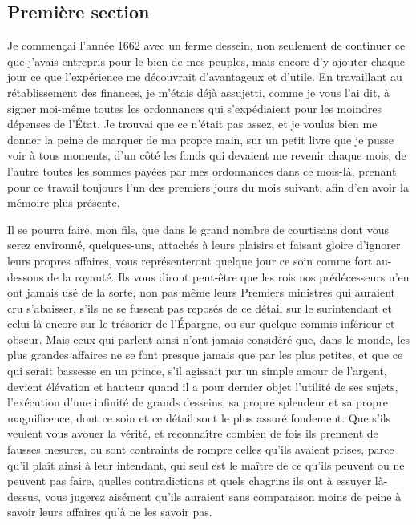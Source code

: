 \documentclass[french,twoside]{book} %
\begin{document}
\subsection[{Première section}]{Première section}
\noindent Je commençai l’année 1662 avec un ferme dessein, non seulement de continuer ce que j’avais entrepris pour le bien de mes peuples, mais encore d’y ajouter chaque jour ce que l’expérience me découvrait d’avantageux et d’utile. En travaillant au rétablissement des finances, je m’étais déjà assujetti, comme je vous l’ai dit, à signer moi-même toutes les ordonnances qui s’expédiaient pour les moindres dépenses de l’État. Je trouvai que ce n’était pas assez, et je voulus bien me donner la peine de marquer de ma propre main, sur un petit livre que je pusse voir à tous moments, d’un côté les fonds qui devaient me revenir chaque mois, de l’autre toutes les sommes payées par mes ordonnances dans ce mois-là, prenant pour ce travail toujours l’un des premiers jours du mois suivant, afin d’en avoir la mémoire plus présente.\par
Il se pourra faire, mon fils, que dans le grand nombre de courtisans dont vous serez environné, quelques-uns, attachés à leurs plaisirs et faisant gloire d’ignorer leurs propres affaires, vous représenteront quelque jour ce soin comme fort au-dessous de la royauté. Ils vous diront peut-être que les rois nos prédécesseurs n’en ont jamais usé de la sorte, non pas même leurs Premiers ministres qui auraient cru s’abaisser, s’ils ne se fussent pas reposés de ce détail sur le surintendant et celui-là encore sur le trésorier de l’Épargne, ou sur quelque commis inférieur et obscur. Mais ceux qui parlent ainsi n’ont jamais considéré que, dans le monde, les plus grandes affaires ne se font presque jamais que par les plus petites, et que ce qui serait bassesse en un prince, s’il agissait par un simple amour de l’argent, devient élévation et hauteur quand il a pour dernier objet l’utilité de ses sujets, l’exécution d’une infinité de grands desseins, sa propre splendeur et sa propre magnificence, dont ce soin et ce détail sont le plus assuré fondement. Que s’ils veulent vous avouer la vérité, et reconnaître combien de fois ils prennent de fausses mesures, ou sont contraints de rompre celles qu’ils avaient prises, parce qu’il plaît ainsi à leur intendant, qui seul est le maître de ce qu’ils peuvent ou ne peuvent pas faire, quelles contradictions et quels chagrins ils ont à essuyer là-dessus, vous jugerez aisément qu’ils auraient sans comparaison moins de peine à savoir leurs affaires qu’à ne les savoir pas.\par
\end{document}
